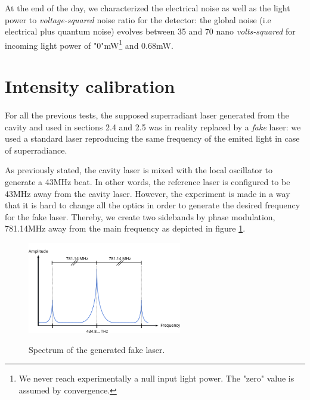\documentclass[10pt]{report}
\begin{document}
At the end of the day, we characterized the electrical noise as well as the light power to \textit{voltage-squared} noise ratio for the detector: the global noise (i.e electrical plus quantum noise) evolves between 35 and 70 nano \textit{volts-squared} for incoming light power of "0"mW\footnote{We never reach experimentally a null input light power. The "zero" value is assumed by convergence.} and 0.68mW.

\section{Intensity calibration}
\paragraph{}

For all the previous tests, the supposed superradiant laser generated from the cavity and used in sections 2.4 and 2.5 was in reality replaced by a \textit{fake} laser: we used a standard laser reproducing the same frequency of the emited light in case of superradiance.

As previously stated, the cavity laser is mixed with the local oscillator to generate a 43MHz beat. In other words, the reference laser is configured to be 43MHz away from the cavity laser. However, the experiment is made in a way that it is hard to change all the optics in order to generate the desired frequency for the fake laser. Thereby, we create two sidebands by phase modulation, 781.14MHz away from the main frequency as depicted in figure \ref{fig:sb-def}.

\begin{figure}[h!]
\caption{Spectrum of the generated fake laser.}
\centering
\includegraphics[width=0.6\textwidth]{sb-def}
\label{fig:sb-def}
\end{figure}
\end{document}
